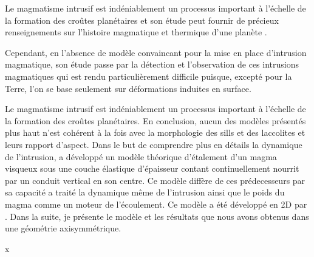 Le  magmatisme intrusif  est indéniablement  un processus  important à
l'échelle de  la formation des  croûtes planétaires et son  étude peut
fournir  de  précieux  renseignements  sur  l'histoire  magmatique  et
thermique d'une planète \citep{White:2006gr}.


Cependant, en  l'absence de modèle  convaincant pour la mise  en place
d'intrusion  magmatique,   son  étude   passe  par  la   détection  et
l'observation   de   ces   intrusions  magmatiques   qui   est   rendu
particulièrement  difficile puisque,  excepté pour  la Terre,  l'on se
base seulement sur déformations induites en surface.



Le  magmatisme intrusif  est indéniablement  un processus  important à
l'échelle  de la  formation des  croûtes planétaires.   En conclusion,
aucun des modèles présentés plus haut n'est cohérent à la fois avec la
morphologie des  sills et  des laccolites  et leurs  rapport d'aspect.
Dans le but de comprendre plus en détails la dynamique de l'intrusion,
\citet{Michaut:2011kg}  a développé  un  modèle théorique  d'étalement
d'un  magma visqueux  sous  une couche  élastique d'épaisseur  contant
continuellement nourrit  par un  conduit vertical  en son  centre.  Ce
modèle  diffère de  ces  prédecesseurs  par sa  capacité  a traité  la
dynamique même  de l'intrusion ainsi  que le  poids du magma  comme un
moteur  de  l'écoulement.   Ce  modèle  a  été  développé  en  2D  par
\citep{Thorey:2014cv}. Dans  la suite,  je présente  le modèle  et les
résultats que nous avons obtenus dans une géométrie axisymmétrique.

x                                        


